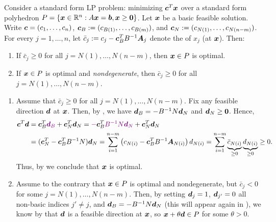 \begin{enumerate}
\begin{proposition}
\label{prp:bfs-optim-nonneg-redu-cost}
Consider a standard form LP problem: minimizing \(\bm{c}^{T}\bm{x}\) over a
standard form polyhedron
\(P=\{\bm{x}\in\mathbb{R}^n:A\bm{x}=\bm{b},\bm{x}\ge\bm{0}\}\).  Let
\(\bm{x}\) be a basic feasible solution. Write \(\bm{c}=(c_1,\dotsc,c_n)\),
\(\bm{c}_{B}:=(c_{B(1)},\dotsc,c_{B(m)})\), and
\(\bm{c}_{N}:=(c_{N(1)},\dotsc,c_{N(n-m)})\). For every \(j=1,\dotsc,n\), let
\(\bar{c}_j:=c_{j}-\bm{c}_{B}^{T}B^{-1}\bm{A}_j\) denote the  of \(x_j\) (at \(\bm{x}\)). Then:
\begin{enumerate}
\item If \(\bar{c}_j\ge 0\) for all \(j=N(1),\dotsc,N(n-m)\), then
\(\bm{x}\in P\) is optimal.
\item If \(\bm{x}\in P\) is optimal and \emph{nondegenerate}, then
\(\bar{c}_j\ge 0\) for all \(j=N(1),\dotsc,N(n-m)\).
\end{enumerate}
\end{proposition}
\begin{pf}
\begin{enumerate}
\item Assume that \(\bar{c}_j\ge 0\) for all \(j=N(1),\dotsc,N(n-m)\).  Fix any
feasible direction \(\bm{d}\) at \(\bm{x}\). Then, by
, we have \(\bm{d}_{B}=-B^{-1}N\bm{d}_{N}\) and
\(\bm{d}_{N}\ge \bm{0}\). Hence,
\begin{align*}
\vect{c}^{T}\vect{d}&=\vect{c}_{B}^{T}\vc{\vect{d}_{B}}+\vect{c}_{N}^{T}\vect{d}_{N}
=\vc{-}\vect{c}_{B}^{T}\vc{B^{-1}N\vect{d}_{N}}+\vect{c}_{N}^{T}\vect{d}_{N} \\
&=(\vect{c}_{N}^{T}-\vect{c}_{B}^{T}B^{-1}N)\vect{d}_{N}
=\sum_{i=1}^{n-m}\left(c_{N(i)}-\vect{c}_{B}^{T}B^{-1}\vect{A}_{N(i)}\right)d_{N(i)}
=\sum_{i=1}^{n-m}\underbrace{\bar{c}_{N(i)}}_{\ge 0}\underbrace{d_{N(i)}}_{\ge 0}
\ge 0.
\end{align*}
Thus, by  we conclude that \(\bm{x}\)
is optimal.  \item Assume to the contrary that \(\bm{x}\in P\) is optimal and
nondegenerate, but \(\bar{c}_j<0\) for some \(j=N(1),\dotsc,N(n-m)\). Then, by
setting \(\bm{d}_j=1\), \(\bm{d}_{j'}=0\) all non-basic indices \(j'\ne
j\), and \(\bm{d}_{B}=-B^{-1}N\bm{d}_{N}\) (this will appear again in
), we know by  that
\(\bm{d}\) is a feasible direction at \(\bm{x}\), so \(\bm{x}+\theta \bm{d}\in P\)
for some \(\theta>0\).


\end{enumerate}
\end{pf}
\end{enumerate}
